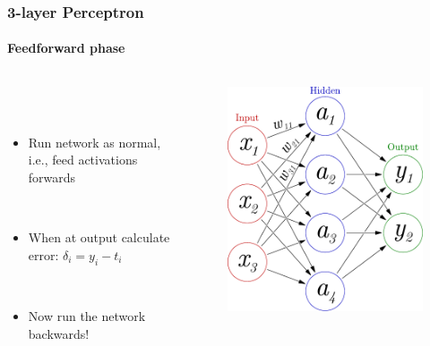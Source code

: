 \documentclass{beamer}
\newcommand{\figheight}{0.72\textheight}
\begin{document}
\begin{frame}[fragile]
\frametitle{3-layer Perceptron}
\framesubtitle{Feedforward phase}
 \begin{columns}[T]
    \begin{column}{.45\textwidth} 
             \  \\
 \   \\   
     
     
\begin{itemize}
\item Run network as normal, i.e., feed activations forwards 

\ \\

 
\item When at output calculate error: 
$\delta_i = y_i - t_i $

\ \\

 
 \item Now run the network backwards! 
\end{itemize}
\end{column}
\begin{column}{.55\textwidth}
\begin{figure}[t]
 \begin{flushleft}

 \includegraphics[height = \figheight]{./fig/3-layer_maths.pdf}


 \end{flushleft}
\end{figure}
\end{column}

\end{columns}
\end{frame}
\end{document}
